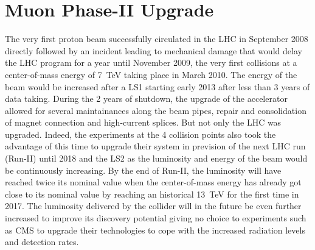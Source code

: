 \renewcommand\evenpagerightmark{{\scshape\small Chapter 3}}
\renewcommand\oddpageleftmark{{\scshape\small Muon Phase-II Upgrade}}

\renewcommand{\bibname}{References}

\hyphenation{}

\chapter[Muon Phase-II Upgrade]%
{Muon Phase-II Upgrade}
\label{chapt:3}
		
	The very first proton beam successfully circulated in the LHC in September 2008 directly followed by an incident leading to mechanical damage that would delay the LHC program for a year until November 2009, the very first collisions at a center-of-mass energy of \SI{7}{TeV} taking place in March 2010. The energy of the beam would be increased after a \acf{LS1} starting early 2013 after less than 3 years of data taking. During the 2 years of shutdown, the upgrade of the accelerator allowed for several maintainances along the beam pipes, repair and consolidation of magnet connection and high-current splices. But not only the LHC was upgraded. Indeed, the experiments at the 4 collision points also took the advantage of this time to upgrade their system in prevision of the next LHC run (Run-II) until 2018 and the \acf{LS2} as the luminosity and energy of the beam would be continuously increasing. By the end of Run-II, the luminosity will have reached twice its nominal value when the center-of-mass energy has already got close to its nominal value by reaching an historical \SI{13}{TeV} for the first time in 2017. The luminosity delivered by the collider will in the future be even further increased to improve its discovery potential giving no choice to experiments such as CMS to upgrade their technologies to cope with the increased radiation levels and detection rates.
	
